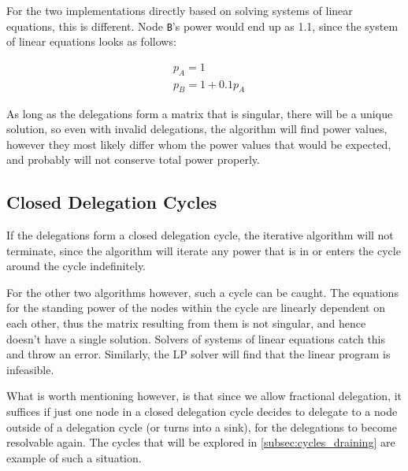 For the two implementations directly based on solving systems of linear equations, this is different. Node \texttt{B}'s power would end up as 1.1, since the system of linear equations looks as follows:

\begin{align*}
& p_A = 1 \\
& p_B = 1 + 0.1p_A
\end{align*}

As long as the delegations form a matrix that is singular, there will be a unique solution, so even with invalid delegations, the algorithm will find power values, however they most likely differ whom the power values that would be expected, and probably will not conserve total power properly. 

\subsection{Closed Delegation Cycles}

If the delegations form a closed delegation cycle, the iterative algorithm will not terminate, since the algorithm will iterate any power that is in or enters the cycle around the cycle indefinitely. 

For the other two algorithms however, such a cycle can be caught. The equations for the standing power of the nodes within the cycle are linearly dependent on each other, thus the matrix resulting from them is not singular, and hence doesn't have a single solution. Solvers of systems of linear equations catch this and throw an error. Similarly, the LP solver will find that the linear program is infeasible.

What is worth mentioning however, is that since we allow fractional delegation, it suffices if just one node in a closed delegation cycle decides to delegate to a node outside of a delegation cycle (or turns into a sink), for the delegations to become resolvable again. The cycles that will be explored in \cref{subsec:cycles_draining} are example of such a situation. 
